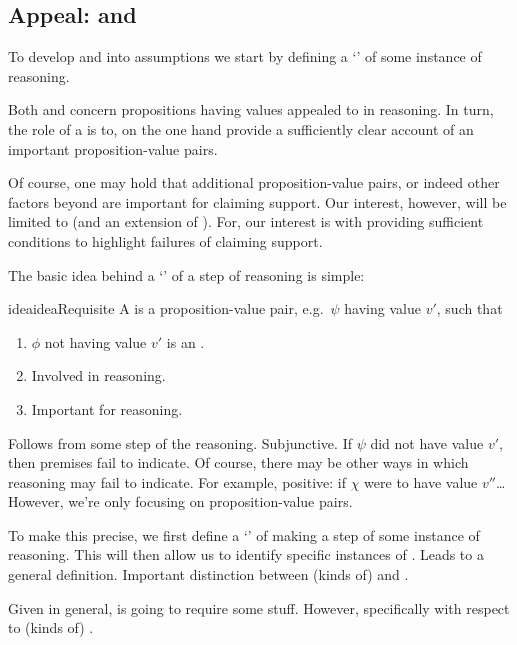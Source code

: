 \subsection{Appeal:  and }
\label{sec:claim-supp-requ}

\begin{note}
  To develop \ideaCSA{} and \ideaCSB{} into assumptions we start by defining a `\requ{}' of some instance of reasoning.

  Both \ideaCSA{} and \ideaCSB{} concern propositions having values appealed to in reasoning.
  In turn, the role of a \requ{} is to, on the one hand provide a sufficiently clear account of an important proposition-value pairs.

  Of course, one may hold that additional proposition-value pairs, or indeed other factors beyond  are important for claiming support.
  Our interest, however, will be limited to  (and an extension of ).
  For, our interest is with providing sufficient conditions to highlight failures of claiming support.
\end{note}

\begin{note}
  The basic idea behind a `\requ{}' of a step of reasoning is simple:
  \begin{restatable}{idea}{ideaRequisite}
    A \requ{} is a proposition-value pair, e.g.\ \(\psi\) having value \(v'\), such that
    \begin{enumerate}
    \item \(\phi\) not having value \(v'\) is an \ep{}.
    \item Involved in reasoning.
    \item Important for reasoning.
    \end{enumerate}
  \end{restatable}

  Follows from some step of the reasoning.
  Subjunctive.
  If \(\psi\) did not have value \(v'\), then premises fail to indicate.
  Of course, there may be other ways in which reasoning may fail to indicate.
  For example, positive: if \(\chi\) were to have value \(v''\)\dots
  However, we're only focusing on proposition-value pairs.
\end{note}

\begin{note}
  To make this precise, we first define a `\result{}' of making a step of some instance of reasoning.
  This will then allow us to identify specific instances of .
  Leads to a general definition.
  Important distinction between (kinds of)  and .

  Given \requ{} in general, \ideaCSB{} is going to require some stuff.
  However, specifically with respect to (kinds of) .
\end{note}

